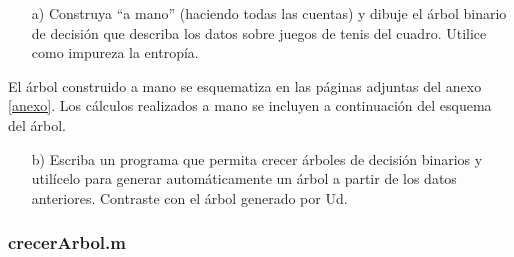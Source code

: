 \documentclass[11pt,a4paper,final]{article}
\begin{document}
\begin{itemize}
   \item[a)] Construya ``a mano'' (haciendo todas las cuentas) y dibuje el árbol binario de decisión que describa los datos sobre juegos de tenis del cuadro. Utilice como impureza la entropía.
\end{itemize}

El árbol construido a mano se esquematiza en las páginas adjuntas del anexo \ref{anexo}. 
Los cálculos realizados a mano se incluyen a continuación del esquema del árbol.

\begin{itemize}

   \item[b)] Escriba un programa que permita crecer árboles de decisión binarios y utilícelo para generar automáticamente un árbol a partir de los datos anteriores. Contraste con el árbol generado por Ud.
\end{itemize}


\subsubsection*{crecerArbol.m}
\end{document}
